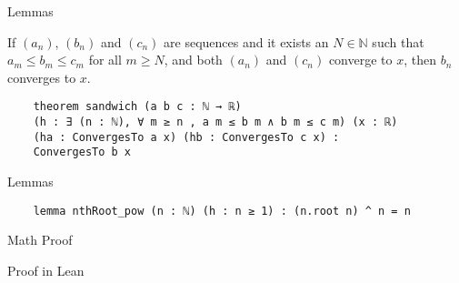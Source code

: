\documentclass{beamer}
\begin{document}
\begin{frame}[fragile]{Lemmas}
    \begin{lemma}
        If $(a_n)$, $(b_n)$ and $(c_n)$ are sequences and it exists an $N \in \mathbb{N}$ such that $a_m \leq b_m \leq c_m$ for all $m \geq N$, and both $(a_n)$ and $(c_n)$ converge to $x$, then $b_n$ converges to $x$.
    \end{lemma}

    \begin{lemma}
    \begin{lstlisting}
    theorem sandwich (a b c : ℕ → ℝ) 
    (h : ∃ (n : ℕ), ∀ m ≥ n , a m ≤ b m ∧ b m ≤ c m) (x : ℝ)
    (ha : ConvergesTo a x) (hb : ConvergesTo c x) :
    ConvergesTo b x
    \end{lstlisting}
    \end{lemma}
\end{frame}

\begin{frame}[fragile]{Lemmas}
    \begin{lemma}
        
    \end{lemma}
    \begin{lemma}
    \begin{lstlisting}
    lemma nthRoot_pow (n : ℕ) (h : n ≥ 1) : (n.root n) ^ n = n
    \end{lstlisting}
    \end{lemma}
\end{frame}

\begin{frame}{Math Proof}
\end{frame}

\begin{frame}{Proof in Lean}
\end{frame}
\end{document}
